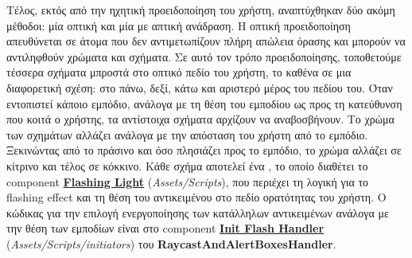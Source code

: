 Τέλος, εκτός από την ηχητική προειδοποίηση του χρήστη, αναπτύχθηκαν δύο ακόμη μέθοδοι: μία οπτική και μία με απτική ανάδραση. Η οπτική προειδοποίηση απευθύνεται σε άτομα που δεν αντιμετωπίζουν πλήρη απώλεια όρασης και μπορούν να αντιληφθούν χρώματα και σχήματα. Σε αυτό τον τρόπο προειδοποίησης, τοποθετούμε τέσσερα σχήματα μπροστά στο οπτικό πεδίο του χρήστη, το καθένα σε μια διαφορετική σχέση: στο πάνω, δεξί, κάτω και αριστερό μέρος του πεδίου του. Όταν εντοπιστεί κάποιο εμπόδιο, ανάλογα με τη θέση του εμποδίου ως προς τη κατεύθυνση που κοιτά ο χρήστης, τα αντίστοιχα σχήματα αρχίζουν να αναβοσβήνουν. Το χρώμα των σχημάτων αλλάζει ανάλογα με την απόσταση του χρήστη από το εμπόδιο. Ξεκινώντας από το πράσινο και όσο πλησιάζει προς το εμπόδιο, το χρώμα αλλάζει σε κίτρινο και τέλος σε κόκκινο. Κάθε σχήμα αποτελεί ένα , το οποίο διαθέτει το component \hyperref[lst:flashingLight]{\textbf{Flashing Light}} (\textit{Assets/Scripts}), που περιέχει τη λογική για το flashing effect και τη θέση του αντικειμένου στο πεδίο ορατότητας του χρήστη. Ο κώδικας για την επιλογή ενεργοποίησης των κατάλληλων αντικειμένων ανάλογα με την θέση των εμποδίων είναι στο component \hyperref[lst:initFlashHandler]{\textbf{Init Flash Handler}} (\textit{Assets/Scripts/initiators}) του \textbf{RaycastAndAlertBoxesHandler}.

